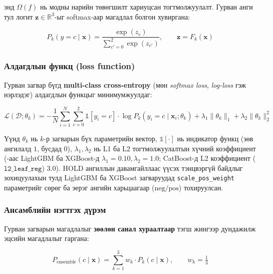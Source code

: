 \noindent энд $\Omega(f)$ нь модны нарийн төвөгшилт хариуцсан тогтмолжуулалт.
Гурван анги тул логит $\mathbf{z} \in \mathbb{R}^3$-ыг softmax-аар магадлал болгон хувиргана:

\begin{equation}
P_k(y = c \mid \mathbf{x}) = \frac{\exp(z_c)}{\sum_{c'=0}^{2} \exp(z_{c'})},
\qquad \mathbf{z} = F_k(\mathbf{x})
\label{eq:softmax}
\end{equation}

\subsubsection{Алдагдлын функц (loss function)}
\label{sec:loss_function}

Гурван загвар бүгд \textbf{multi-class cross-entropy} (мөн \emph{softmax loss}, \emph{log-loss}
гэж нэрлэдэг) алдагдлын функцыг минимумжуулдаг:

\begin{equation}
\boxed{
\mathcal{L}(\mathcal{D}; \theta_k) = -\frac{1}{N} \sum_{i=1}^{N} \sum_{c=0}^{2}
\mathbb{1}[y_i = c] \cdot \log P_k(y_i = c \mid \mathbf{x}_i; \theta_k)
+ \lambda_1 \|\theta_k\|_1 + \lambda_2 \|\theta_k\|_2^2
}
\label{eq:loss}
\end{equation}

\noindent Үүнд $\theta_k$ нь $k$-р загварын бүх параметрийн вектор,
$\mathbb{1}[\cdot]$ нь индикатор функц (зөв ангилалд $1$, бусдад $0$),
$\lambda_1, \lambda_2$ нь L1 ба L2 тогтмолжуулалтын хүчний коэффициент
(-аас LightGBM ба XGBoost-д $\lambda_1 = 0.10,
\lambda_2 = 1.0$; CatBoost-д L2 коэффициент ($\texttt{l2\_leaf\_reg}$) $3.0$).
HOLD ангиллын давамгайллаас үүсэх тэнцвэргүй байдлыг зохицуулахын тулд
LightGBM ба XGBoost загваруудад \texttt{scale\_pos\_weight} параметрийг сөрөг
ба эерэг ангийн харьцаагаар ($\text{neg}/\text{pos}$) тохируулсан.

\subsubsection{Ансамблийн нэгтгэх дүрэм}

Гурван загварын магадлалыг \textbf{зөөлөн санал хураалтаар}
тэгш жингээр дундажилж эцсийн магадлалыг гаргана:

\begin{equation}
P_{\text{ensemble}}(c \mid \mathbf{x}) = \sum_{k=1}^{3} w_k \cdot P_k(c \mid \mathbf{x}),
\qquad w_k = \tfrac{1}{3}
\label{eq:soft_voting}
\end{equation}


